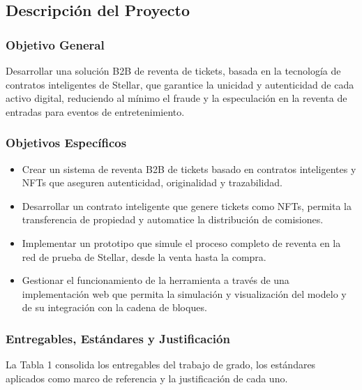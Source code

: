 \subsection{Descripción del Proyecto}

\subsubsection{Objetivo General}

Desarrollar una solución B2B de reventa de tickets, basada en la tecnología de contratos inteligentes de
Stellar, que garantice la unicidad y autenticidad de cada activo digital, reduciendo al mínimo el fraude y la
especulación en la reventa de entradas para eventos de entretenimiento.

\subsubsection{Objetivos Específicos}

\begin{itemize}\setlength{\itemsep}{2pt}
    \item Crear un sistema de reventa B2B de tickets basado en contratos inteligentes y NFTs que aseguren
autenticidad, 
    originalidad y trazabilidad.
    \item Desarrollar un contrato inteligente que genere tickets como NFTs, permita la transferencia de
propiedad y 
    automatice la distribución de comisiones.
    \item Implementar un prototipo que simule el proceso completo de reventa en la red de prueba de Stellar,
desde la 
    venta hasta la compra.
    \item Gestionar el funcionamiento de la herramienta a través de una implementación web que permita la
simulación y 
    visualización del modelo y de su integración con la cadena de bloques.
\end{itemize}

\subsubsection{Entregables, Estándares y Justificación}

La Tabla 1 consolida los entregables del trabajo de grado, los estándares aplicados como
marco de referencia 
y la justificación de cada uno.

